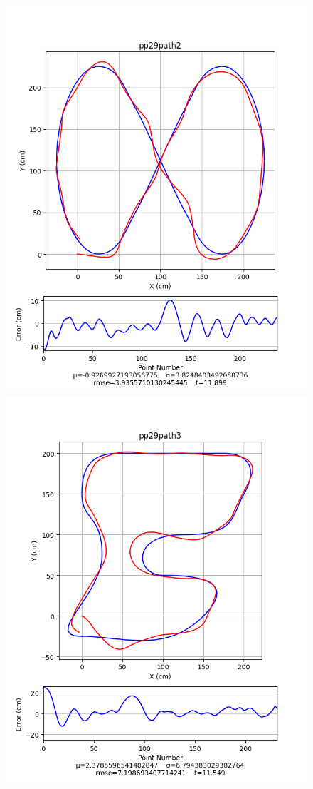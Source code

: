 \documentclass[mla8alt]{mla}
\begin{document}
\begin{paper}
\begin{figure}[H]
\includegraphics[width=\linewidth]{pathData/pppath2}
\endminipage\\
\includegraphics[width=\linewidth]{pathData/pppath3}

\end{figure}
\end{paper}
\end{document}

